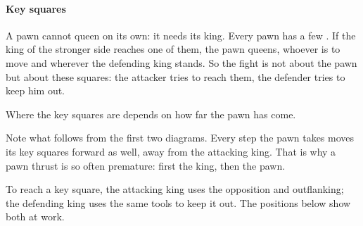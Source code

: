 
\paragraph{Key squares}\label{key-squares}
A pawn cannot queen on its own: it needs its king. Every pawn has a few
.
If the king of the stronger side reaches one of them, the pawn queens, whoever is to move and
wherever the defending king stands. So the fight is not about the pawn but about these squares:
the attacker tries to reach them, the defender tries to keep him out.

Where the key squares are depends on how far the pawn has come.





Note what follows from the first two diagrams. Every step the pawn takes moves its key squares
forward as well, away from the attacking king. That is why a pawn thrust is so often premature:
first the king, then the pawn.

To reach a key square, the attacking king uses the opposition and outflanking; the defending king
uses the same tools to keep it out. The positions below show both at work.

